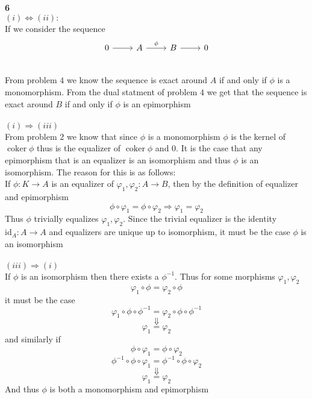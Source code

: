 \documentclass[12pt]{article}
\newenvironment{ques}[1]{\textbf{#1}\vspace{1 mm}\\ }{\bigskip}
\theoremstyle{definition}
\DeclareMathOperator\coker{coker}
\newcommand{\id}{\text{id}}
\begin{document}
\begin{ques}{6}
	$(i) \Leftrightarrow (ii):$ \\
	If we consider the sequence 
	$$\begin{tikzcd}
	0 \arrow[r] & A \arrow[r, "\phi"] & B \arrow[r] & 0\\
	\end{tikzcd}$$
	From problem $4$ we know the sequence is exact around $A$ if and only if
	$\phi$ is a monomorphism. From the
	dual statment of problem $4$ we get that the sequence is exact around $B$
	if and only if $\phi$ is an epimorphism\\
	\\
	$(i) \Rightarrow (iii)$ \\
	From problem $2$ we know that since $\phi$ is a monomorphism $\phi$ is the
	kernel of $\coker \phi$ thus is the equalizer of $\coker \phi$ and $0$. It
	is the case that any epimorphism that is an equalizer is an isomorphism and
	thus $\phi$ is an isomorphism. The reason for this is as follows:\\
	If $\phi: K \to A$ is an equalizer of $\varphi_1, \varphi_2 :A \to B$, then by
	the definition of equalizer and epimorphism 
	$$\phi \circ \varphi_1 = \phi \circ \varphi_2 \Rightarrow \varphi_1 = \varphi_2$$
	Thus $\phi$ trivially equalizes $\varphi_1, \varphi_2$. Since the trivial
	equalizer is the identity $\id_{A}:A \to A$ and equalizers are unique up to
	isomorphism, it must be the case $\phi$ is an isomorphism\\
	\\
	$(iii) \Rightarrow (i)$\\
	If $\phi$ is an isomorphism then there exists a $\phi^{-1}$. Thus for some
	morphisms $\varphi_1, \varphi_2$
	$$\varphi_1 \circ \phi =  \varphi_2 \circ \phi$$
	it must be the case 
	$$\varphi_1 \circ \phi \circ \phi^{-1} =  \varphi_2 \circ \phi \circ \phi^{-1}$$
	$$\Downarrow$$
	$$\varphi_1  =  \varphi_2 $$
	and similarly if 
	$$\phi \circ \varphi_1  = \phi \circ \varphi_2$$
	$$\phi^{-1} \circ \phi \circ \varphi_1  = \phi^{-1} \circ \phi \circ \varphi_2$$
	$$\Downarrow$$
	$$\varphi_1  =  \varphi_2 $$
	And thus $\phi$ is both a monomorphism and epimorphism
\end{ques}
\end{document}
